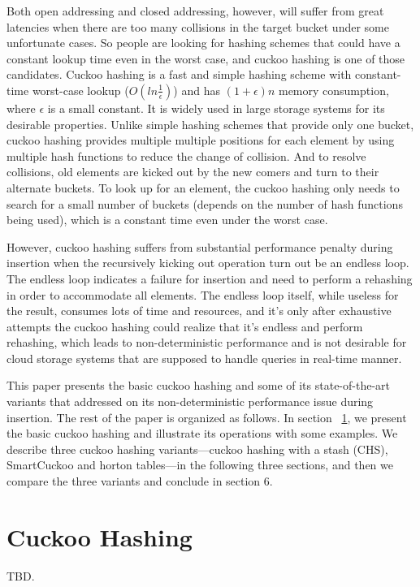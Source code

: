 \documentclass[runningheads]{llncs}
\begin{document}
Both open addressing and closed addressing, however, will suffer from great latencies when there are too many collisions in the target bucket under some unfortunate cases. So people are looking for hashing schemes that could have a constant lookup time even in the worst case, and cuckoo hashing is one of those candidates. Cuckoo hashing is a fast and simple hashing scheme with constant-time worst-case lookup ($O(ln\frac{1}{\epsilon})$) and has $(1+\epsilon)n$ memory consumption, where $\epsilon$ is a small constant. It is widely used in large storage systems for its desirable properties. Unlike simple hashing schemes that provide only one bucket, cuckoo hashing provides multiple multiple positions for each element by using multiple hash functions to reduce the change of collision. And to resolve collisions, old elements are kicked out by the new comers and turn to their alternate buckets. To look up for an element, the cuckoo hashing only needs to search for a small number of buckets (depends on the number of hash functions being used), which is a constant time even under the worst case.

However, cuckoo hashing suffers from substantial performance penalty during insertion when the recursively kicking out operation turn out be an endless loop. The endless loop indicates a failure for insertion and need to perform a rehashing in order to accommodate all elements. The endless loop itself, while useless for the result, consumes lots of time and resources, and it's only after exhaustive attempts the cuckoo hashing could realize that it's endless and perform rehashing, which leads to non-deterministic performance and is not desirable for cloud storage systems that are supposed to handle queries in real-time manner. 

This paper presents the basic cuckoo hashing and some of its state-of-the-art variants that addressed on its non-deterministic performance issue during insertion. The rest of the paper is organized as follows. In section ~\ref{sec:cuckoo}, we present the basic cuckoo hashing and illustrate its operations with some examples. We describe three cuckoo hashing variants---cuckoo hashing with a stash (CHS), SmartCuckoo and horton tables---in the following three sections, and then we compare the three variants and conclude in section 6.

\section{Cuckoo Hashing}
\label{sec:cuckoo}
TBD.
\end{document}
